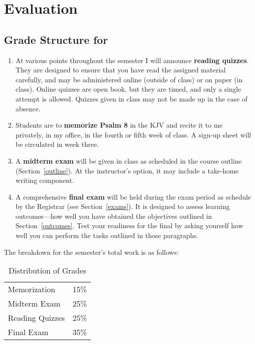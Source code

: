 \documentclass[titlepage]{article}
\begin{document}
\section{Evaluation}
\label{evaluation}

\subsection{Grade Structure for \ccode}
\label{structure}

\begin{enumerate}
 \item At various points throughout the semester I will announce
   \textbf{reading quizzes}. They are designed to ensure that you have
   read the assigned material carefully, and may be administered online
   (outside of class) or on paper (in class). Online quizzes are open
   book, but they are timed, and only a single attempt is allowed.
   Quizzes given in class may not be made up in the case of absence.
 \item Students are to \textbf{memorize Psalm 8} in the KJV and recite
   it to me privately, in my office, in the fourth or fifth week of
   class. A sign-up sheet will be circulated in week three.
 \item A \textbf{midterm exam} will be given in class as scheduled in
   the course outline (Section~\ref{outline}). At the instructor's
   option, it may include a take-home writing component.
 \item A comprehensive \textbf{final exam} will be held during the exam
   period as schedule by the Registrar (see Section~\ref{exams}). It is
   designed to assess learning outcomes---how well you have obtained the
   objectives outlined in Section~\ref{outcomes}. Test your readiness
   for the final by asking yourself how well you can perform the tasks
   outlined in those paragraphs.
\end{enumerate}

The breakdown for the semester's total work is as follows:

\begin{table}[htbp]
  \centering
  \begin{tabular}{lr}
    \toprule
    Memorization    & 15\% \\
    Midterm Exam    & 25\% \\
    Reading Quizzes & 25\% \\
    Final Exam      & 35\% \\
    \bottomrule
  \end{tabular}
  \caption{Distribution of Grades}
  \label{distribution}
\end{table}
\end{document}
